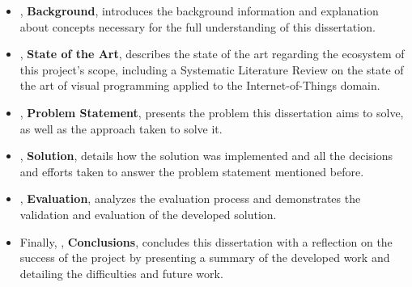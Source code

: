 \begin{itemize}
  \item {}, \textbf{Background}, introduces the background information and explanation about concepts necessary for the full understanding of this dissertation.
  \item {}, \textbf{State of the Art}, describes the state of the art regarding the ecosystem of this project's scope, including a Systematic Literature Review on the state of the art of visual programming applied to the Internet-of-Things domain.
  \item {}, \textbf{Problem Statement}, presents the problem this dissertation aims to solve, as well as the approach taken to solve it.
  \item {}, \textbf{Solution}, details how the solution was implemented and all the decisions and efforts taken to answer the problem statement mentioned before.
  \item {}, \textbf{Evaluation}, analyzes the evaluation process and demonstrates the validation and evaluation of the developed solution.
  \item Finally, , \textbf{Conclusions}, concludes this dissertation with a reflection on the success of the project by presenting a summary of the developed work and detailing the difficulties and future work.
\end{itemize}